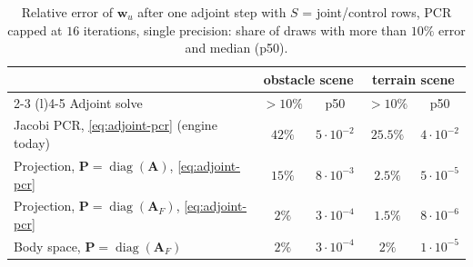 \begin{table}[h]
  \centering
  \small
  \begin{tabular}{@{}lcccc@{}}
    \toprule
    & \multicolumn{2}{c}{obstacle scene} & \multicolumn{2}{c}{terrain scene} \\
    \cmidrule(lr){2-3} \cmidrule(l){4-5}
    Adjoint solve & $>10\%$ & p50 & $>10\%$ & p50 \\
    \midrule
    Jacobi PCR, \eqref{eq:adjoint-pcr} (engine today) & $42\%$ & $5 \cdot 10^{-2}$ & $25.5\%$ & $4 \cdot 10^{-2}$ \\
    Projection, $\mathbf{P} = \operatorname{diag}(\mathbf{A})$, \eqref{eq:adjoint-pcr} & $15\%$ & $8 \cdot 10^{-3}$ & $2.5\%$ & $5 \cdot 10^{-5}$ \\
    Projection, $\mathbf{P} = \operatorname{diag}(\mathbf{A}_F)$, \eqref{eq:adjoint-pcr} & $2\%$ & $3 \cdot 10^{-4}$ & $1.5\%$ & $8 \cdot 10^{-6}$ \\
    Body space, $\mathbf{P} = \operatorname{diag}(\mathbf{A}_F)$ & $2\%$ & $3 \cdot 10^{-4}$ & $2\%$ & $1 \cdot 10^{-5}$ \\
    \bottomrule
  \end{tabular}
  \caption{Relative error of $\mathbf{w}_u$ after one adjoint step with
    $S$ = joint/control rows, PCR capped at $16$ iterations, single
    precision: share of draws with more than $10\%$ error and median
    (p50).}
  \label{tab:adjoint-elimination}
\end{table}

